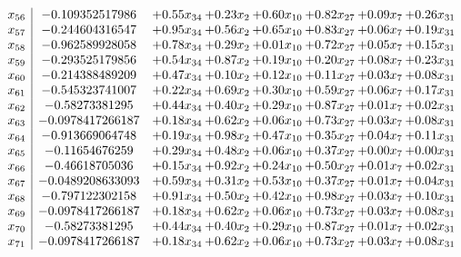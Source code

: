 \documentclass[8pt]{article}
\begin{document}
\[\begin{array}{c| c c@{\hskip 2pt} c@{\hskip 2pt} c@{\hskip 2pt} c@{\hskip 2pt} c@{\hskip 2pt} c@{\hskip 2pt} }
 x_{56}   &  -0.109352517986 & +  0.55 x_{34} & +  0.23 x_{2} & +  0.60 x_{10} & +  0.82 x_{27} & +  0.09 x_{7} & +  0.26 x_{31}\\
 x_{57}   &  -0.244604316547 & +  0.95 x_{34} & +  0.56 x_{2} & +  0.65 x_{10} & +  0.83 x_{27} & +  0.06 x_{7} & +  0.19 x_{31}\\
 x_{58}   &  -0.962589928058 & +  0.78 x_{34} & +  0.29 x_{2} & +  0.01 x_{10} & +  0.72 x_{27} & +  0.05 x_{7} & +  0.15 x_{31}\\
 x_{59}   &  -0.293525179856 & +  0.54 x_{34} & +  0.87 x_{2} & +  0.19 x_{10} & +  0.20 x_{27} & +  0.08 x_{7} & +  0.23 x_{31}\\
 x_{60}   &  -0.214388489209 & +  0.47 x_{34} & +  0.10 x_{2} & +  0.12 x_{10} & +  0.11 x_{27} & +  0.03 x_{7} & +  0.08 x_{31}\\
 x_{61}   &  -0.545323741007 & +  0.22 x_{34} & +  0.69 x_{2} & +  0.30 x_{10} & +  0.59 x_{27} & +  0.06 x_{7} & +  0.17 x_{31}\\
 x_{62}   &  -0.58273381295 & +  0.44 x_{34} & +  0.40 x_{2} & +  0.29 x_{10} & +  0.87 x_{27} & +  0.01 x_{7} & +  0.02 x_{31}\\
 x_{63}   &  -0.0978417266187 & +  0.18 x_{34} & +  0.62 x_{2} & +  0.06 x_{10} & +  0.73 x_{27} & +  0.03 x_{7} & +  0.08 x_{31}\\
 x_{64}   &  -0.913669064748 & +  0.19 x_{34} & +  0.98 x_{2} & +  0.47 x_{10} & +  0.35 x_{27} & +  0.04 x_{7} & +  0.11 x_{31}\\
 x_{65}   &  -0.11654676259 & +  0.29 x_{34} & +  0.48 x_{2} & +  0.06 x_{10} & +  0.37 x_{27} & +  0.00 x_{7} & +  0.00 x_{31}\\
 x_{66}   &  -0.46618705036 & +  0.15 x_{34} & +  0.92 x_{2} & +  0.24 x_{10} & +  0.50 x_{27} & +  0.01 x_{7} & +  0.02 x_{31}\\
 x_{67}   &  -0.0489208633093 & +  0.59 x_{34} & +  0.31 x_{2} & +  0.53 x_{10} & +  0.37 x_{27} & +  0.01 x_{7} & +  0.04 x_{31}\\
 x_{68}   &  -0.797122302158 & +  0.91 x_{34} & +  0.50 x_{2} & +  0.42 x_{10} & +  0.98 x_{27} & +  0.03 x_{7} & +  0.10 x_{31}\\
 x_{69}   &  -0.0978417266187 & +  0.18 x_{34} & +  0.62 x_{2} & +  0.06 x_{10} & +  0.73 x_{27} & +  0.03 x_{7} & +  0.08 x_{31}\\
 x_{70}   &  -0.58273381295 & +  0.44 x_{34} & +  0.40 x_{2} & +  0.29 x_{10} & +  0.87 x_{27} & +  0.01 x_{7} & +  0.02 x_{31}\\
 x_{71}   &  -0.0978417266187 & +  0.18 x_{34} & +  0.62 x_{2} & +  0.06 x_{10} & +  0.73 x_{27} & +  0.03 x_{7} & +  0.08 x_{31}\\

\end{array}\]
\end{document}

